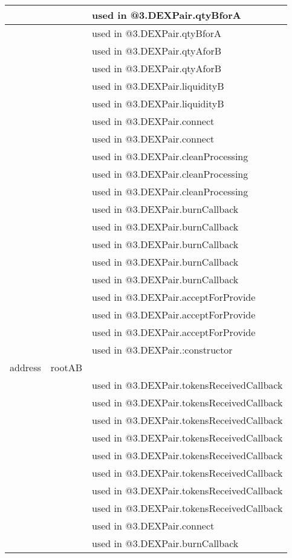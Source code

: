 \begin{tabular}{|l|l|p{5cm}|}
 & & used in @3.DEXPair.qtyBforA\\\hline
 & & used in @3.DEXPair.qtyBforA\\\hline
 & & used in @3.DEXPair.qtyAforB\\\hline
 & & used in @3.DEXPair.qtyAforB\\\hline
 & & used in @3.DEXPair.liquidityB\\\hline
 & & used in @3.DEXPair.liquidityB\\\hline
 & & used in @3.DEXPair.connect\\\hline
 & & used in @3.DEXPair.connect\\\hline
 & & used in @3.DEXPair.cleanProcessing\\\hline
 & & used in @3.DEXPair.cleanProcessing\\\hline
 & & used in @3.DEXPair.cleanProcessing\\\hline
 & & used in @3.DEXPair.burnCallback\\\hline
 & & used in @3.DEXPair.burnCallback\\\hline
 & & used in @3.DEXPair.burnCallback\\\hline
 & & used in @3.DEXPair.burnCallback\\\hline
 & & used in @3.DEXPair.burnCallback\\\hline
 & & used in @3.DEXPair.acceptForProvide\\\hline
 & & used in @3.DEXPair.acceptForProvide\\\hline
 & & used in @3.DEXPair.acceptForProvide\\\hline
 & & used in @3.DEXPair.:constructor\\\hline
address & rootAB &  \\\hline
 & & used in @3.DEXPair.tokensReceivedCallback\\\hline
 & & used in @3.DEXPair.tokensReceivedCallback\\\hline
 & & used in @3.DEXPair.tokensReceivedCallback\\\hline
 & & used in @3.DEXPair.tokensReceivedCallback\\\hline
 & & used in @3.DEXPair.tokensReceivedCallback\\\hline
 & & used in @3.DEXPair.tokensReceivedCallback\\\hline
 & & used in @3.DEXPair.tokensReceivedCallback\\\hline
 & & used in @3.DEXPair.tokensReceivedCallback\\\hline
 & & used in @3.DEXPair.connect\\\hline
 & & used in @3.DEXPair.burnCallback\\\hline
\end{tabular}
\fi


